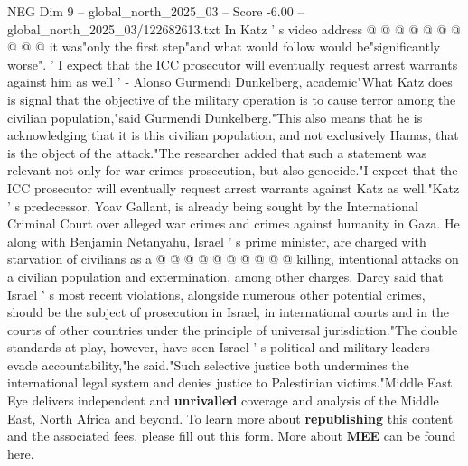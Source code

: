 \begin{textsample}{NEG Dim 9 – global\_north\_2025\_03 – Score -6.00 – global\_north\_2025\_03/122682613.txt}
In Katz ' s video address @ @ @ @ @ @ @ @ @ @ it was"only the first step"and what would follow would be"significantly worse". ' I expect that the ICC prosecutor will eventually request arrest warrants against him as well ' - Alonso Gurmendi Dunkelberg, academic"What Katz does is signal that the objective of the military operation is to cause terror among the civilian population,"said Gurmendi Dunkelberg."This also means that he is acknowledging that it is this civilian population, and not exclusively Hamas, that is the object of the attack."The researcher added that such a statement was relevant not only for war crimes prosecution, but also genocide."I expect that the ICC prosecutor will eventually request arrest warrants against Katz as well."Katz ' s predecessor, Yoav Gallant, is already being sought by the International Criminal Court over alleged war crimes and crimes against humanity in Gaza.
He along with Benjamin Netanyahu, Israel ' s prime minister, are charged with starvation of civilians as a @ @ @ @ @ @ @ @ @ @ killing, intentional attacks on a civilian population and extermination, among other charges.
Darcy said that Israel ' s most recent violations, alongside numerous other potential crimes, should be the subject of prosecution in Israel, in international courts and in the courts of other countries under the principle of universal jurisdiction."The double standards at play, however, have seen Israel ' s political and military leaders evade accountability,"he said."Such selective justice both undermines the international legal system and denies justice to Palestinian victims."Middle East Eye delivers independent and \textbf{unrivalled} coverage and analysis of the Middle East, North Africa and beyond.
To learn more about \textbf{republishing} this content and the associated fees, please fill out this form.
More about \textbf{MEE} can be found here.

\end{textsample}
